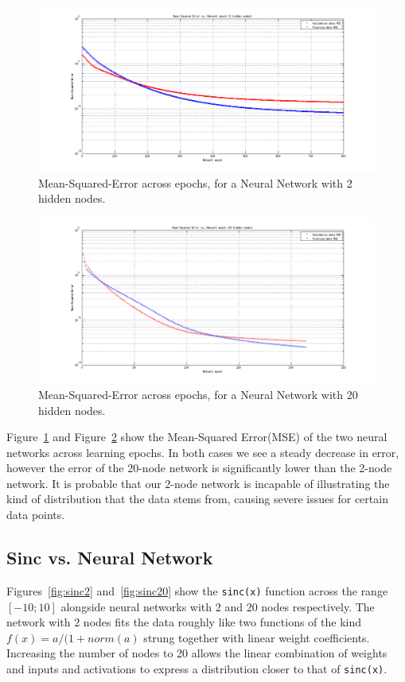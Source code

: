 \begin{figure}[h!]
  \includegraphics[width=\linewidth]{images/mse2.png}
  \caption{Mean-Squared-Error across epochs, for a Neural Network with 2 hidden nodes.
  \label{fig:mse2}}
\end{figure}

\begin{figure}[h!]
  \includegraphics[width=\linewidth]{images/mse20.png}
  \caption{Mean-Squared-Error across epochs, for a Neural Network with 20 hidden nodes.
  \label{fig:mse20}}
\end{figure}

Figure~\ref{fig:mse2} and Figure~\ref{fig:mse20} show the Mean-Squared Error(MSE) of the two
neural networks across learning epochs. In both cases we see a steady decrease in error, however
the error of the 20-node network is significantly lower than the 2-node network. It is probable that
our 2-node network is incapable of illustrating the kind of distribution that the data stems from,
causing severe issues for certain data points.

\subsection*{Sinc vs. Neural Network}
Figures~\ref{fig:sinc2} and~\ref{fig:sinc20} show the \texttt{sinc(x)} function across the range
$[-10; 10]$ alongside neural networks with 2 and 20 nodes respectively. The network with 2 nodes
fits the data roughly like two functions of the kind $f(x)=a/(1+norm(a)$ strung together with linear
weight coefficients. Increasing the number of nodes to 20 allows the linear combination of weights
and inputs and activations to express a distribution closer to that of \texttt{sinc(x)}.

